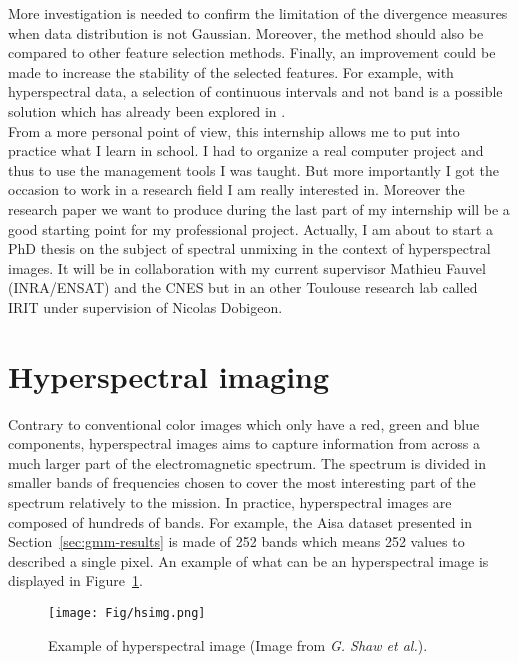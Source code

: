 \documentclass[a4paper,11pt,DIV=16,abstracton]{scrartcl}
\begin{document}
More investigation is needed to confirm the limitation of the divergence measures when data distribution is not Gaussian. Moreover, the method should also be compared to other feature selection methods. Finally, an improvement could be made to increase the stability of the selected features. For example, with hyperspectral data, a selection of continuous intervals and not band is a possible solution which has already been explored in \cite{serpico2007extraction}.\\

From a more personal point of view, this internship allows me to put into practice what I learn in school. I had to organize a real computer project and thus to use the management tools I was taught. But more importantly I got the occasion to work in a research field I am really interested in. Moreover the research paper we want to produce during the last part of my internship will be a good starting point for my professional project. Actually, I am about to start a PhD thesis on the subject of spectral unmixing in the context of hyperspectral images. It will be in collaboration with my current supervisor Mathieu Fauvel (INRA/ENSAT) and the CNES but in an other Toulouse research lab called IRIT under supervision of Nicolas Dobigeon.

\newpage

\appendix

\section{Hyperspectral imaging}
\label{app:hs-img}

Contrary to conventional color images which only have a red, green and blue components, hyperspectral images aims to capture information from across a much larger part of the electromagnetic spectrum. The spectrum is divided in smaller bands of frequencies chosen to cover the most interesting part of the spectrum relatively to the mission. In practice, hyperspectral images are composed of hundreds of bands. For example, the Aisa dataset presented in Section~\ref{sec:gmm-results} is made of 252 bands which means 252 values to described a single pixel. An example of what can be an hyperspectral image is displayed in Figure~\ref{fig:hs-img}.

\begin{figure}[!ht]
    \centering
    \texttt{[image: Fig/hsimg.png]}
    \caption{Example of hyperspectral image (Image from \emph{G. Shaw et al.}).\label{fig:hs-img}}
\end{figure}
\end{document}
